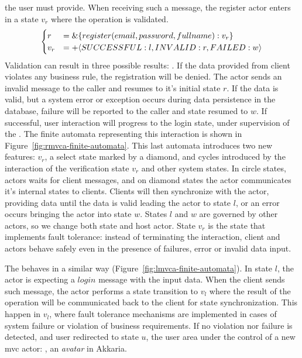 the user must provide. When receiving such a message, the register
actor enters in a state $v_r$ where the operation is validated.
\begin{align}
  \begin{cases}
    r &= \& \{register(email, password, fullname): v_r\}\\
    v_r &= + \langle SUCCESSFUL: l, INVALID: r, FAILED: w \rangle
  \end{cases}
          \label{eq:rmvca-register-validate}
\end{align}
%
Validation can result in three possible results: .
%
If the data provided from client violates any business rule, the
registration will be denied. The actor sends an invalid message to the
caller and resumes to it's initial state $r$.
%
If the data is valid, but a system error or exception occurs during
data persistence in the database, failure will be reported to the
caller and state resumed to $w$.
%
If successful, user interaction will progress to the login state,
under supervision of the .
%
The finite automata representing this interaction is shown in
Figure~\ref{fig:rmvca-finite-automata}.
%
 This last automata
introduces two new features: $v_r$, a select state marked by a
diamond, and cycles introduced by the interaction of the verification
state $v_r$ and other system states.
%
In circle states, actors waits for client messages, and on diamond
states the actor communicates it's internal states to clients. Clients
will then synchronize with the actor, providing data until the data is
valid leading the actor to state $l$, or an error occurs bringing the
actor into state $w$. States $l$ and $w$ are governed by other actors,
so we change both state and host actor.
%
State $v_r$ is the state that implements fault tolerance: instead of
terminating the interaction, client and actors behave safely even in
the presence of failures, error or invalid data input.
%
\par
%
The  behaves in a similar way
(Figure~\ref{fig:lmvca-finite-automata}). In state $l$, the actor is
expecting a $login$ message with the input data. When the client sends
such message, the actor performs a state transition to $v_l$ where the
result of the operation will be communicated back to the client for
state synchronization. This happen in $v_l$, where fault tolerance
mechanisms are implemented in cases of system failure or violation of
business requirements. If no violation nor failure is detected, and
user redirected to state $u$, the user area under the control of a new
mvc actor: , an \emph{avatar} in Akkaria.
%

%



